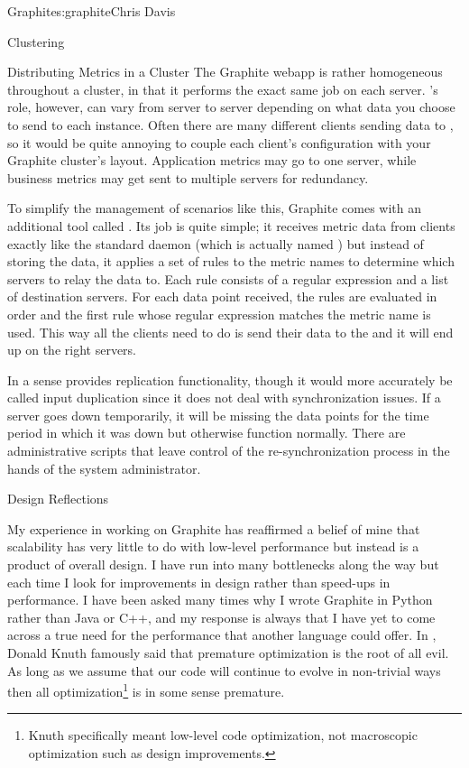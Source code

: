 \begin{aosachapter}{Graphite}{s:graphite}{Chris Davis}
\begin{aosasect1}{Clustering}
\begin{aosasect2}{Distributing Metrics in a Cluster}
The Graphite webapp is rather homogeneous throughout a cluster, in
that it performs the exact same job on each server. 's role,
however, can vary from server to server depending on what data you
choose to send to each instance. Often there are many different
clients sending data to , so it would be quite annoying to
couple each client's configuration with your Graphite cluster's
layout. Application metrics may go to one  server, while
business metrics may get sent to multiple  servers for
redundancy.

To simplify the management of scenarios like this, Graphite comes with
an additional tool called . Its job is quite simple;
it receives metric data from clients exactly like the standard 
daemon (which is actually named ) but instead of storing
the data, it applies a set of rules to the metric names to determine
which  servers to relay the data to. Each rule consists of
a regular expression and a list of destination servers. For each data
point received, the rules are evaluated in order and the first rule
whose regular expression matches the metric name is used. This way all
the clients need to do is send their data to the  and it
will end up on the right servers.

In a sense  provides replication functionality, though it
would more accurately be called input duplication since it does not
deal with synchronization issues. If a server goes down temporarily,
it will be missing the data points for the time period in which it was
down but otherwise function normally. There are administrative scripts
that leave control of the re-synchronization process in the hands of
the system administrator.

\end{aosasect2}

\end{aosasect1}

\begin{aosasect1}{Design Reflections}

My experience in working on Graphite has reaffirmed a belief of mine
that scalability has very little to do with low-level performance but
instead is a product of overall design. I have run into many
bottlenecks along the way but each time I look for improvements in
design rather than speed-ups in performance. I have been asked many
times why I wrote Graphite in Python rather than Java or C++, and my
response is always that I have yet to come across a true need for the
performance that another language could offer. In
\cite{bib:knuth:goto}, Donald Knuth famously said that premature
optimization is the root of all evil.  As long as we assume that our
code will continue to evolve in non-trivial ways then all
optimization\footnote{Knuth specifically meant low-level code
optimization, not macroscopic optimization such as design
improvements.} is in some sense premature.


\end{aosasect1}
\end{aosachapter}

